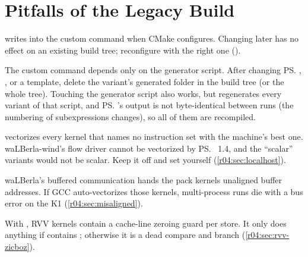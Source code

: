 \chapter{Pitfalls of the Legacy Build}\label{r04:app:pitfalls}

\begin{pitfall}
   writes  into the
  custom command when CMake configures. Changing  later has no effect
  on an existing build tree; reconfigure with the right one
  ().
\end{pitfall}

\begin{pitfall}
  The custom command depends only on the generator script. After changing \ps{},
  ,  or a template, delete the variant's
  generated folder in the build tree (or the whole tree). Touching the generator script
  also works, but regenerates every variant of that script, and \ps{}'s output is not
  byte-identical between runs (the numbering of subexpressions changes), so all of them
  are recompiled.
\end{pitfall}

\begin{pitfall}[\texttt{WALBERLA\_OPTIMIZE\_FOR\_LOCALHOST=ON}]
  vectorizes every kernel that names no instruction set with the machine's best one.
  waLBerla-wind's flow driver cannot be vectorized by \ps{}~1.4, and the ``scalar''
  variants would not be scalar. Keep it off and set  yourself
  (\cref{r04:sec:localhost}).
\end{pitfall}

\begin{pitfall}
  waLBerla's buffered communication hands the pack kernels unaligned buffer addresses.
  If GCC auto-vectorizes those kernels, multi-process runs die with a bus error on the
  K1 (\cref{r04:sec:misaligned}).
\end{pitfall}

\begin{pitfall}
  With , RVV kernels contain a cache-line zeroing guard per store. It
  only does anything if  contains ; otherwise it is a dead
  compare and branch (\cref{r04:sec:rvv-zicboz}).
\end{pitfall}

